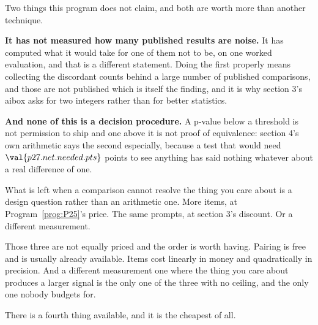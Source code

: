 \begin{fr}
Two things this program does not claim, and both are worth more than another
technique.

\textbf{It has not measured how many published results are noise.} It has
computed what it would take for one of them not to be, on one worked
evaluation, and that is a different statement. Doing the first properly means
collecting the discordant counts behind a large number of published
comparisons, and those are not published \dash{} which is itself the
finding, and it is why section 3's aibox asks for two integers rather than
for better statistics.

\textbf{And none of this is a decision procedure.} A p-value below a
threshold is not permission to ship and one above it is not proof of
equivalence: section 4's own arithmetic says the second especially, because a
test that would need $\val{p27.net.needed.pts}$ points to see anything has
said nothing whatever about a real difference of one.

What is left when a comparison cannot resolve the thing you care about is a
design question rather than an arithmetic one. More items, at
Program~\ref{prog:P25}'s price. The same prompts, at section 3's discount.
Or a different measurement.

Those three are not equally priced and the order is worth having. Pairing is
free and is usually already available. Items cost linearly in money and
quadratically in precision. And a different measurement \dash{} one where the
thing you care about produces a larger signal \dash{} is the only one of the
three with no ceiling, and the only one nobody budgets for.

There is a fourth thing available, and it is the cheapest of all.
\dotline
\nextframe
\end{fr}

